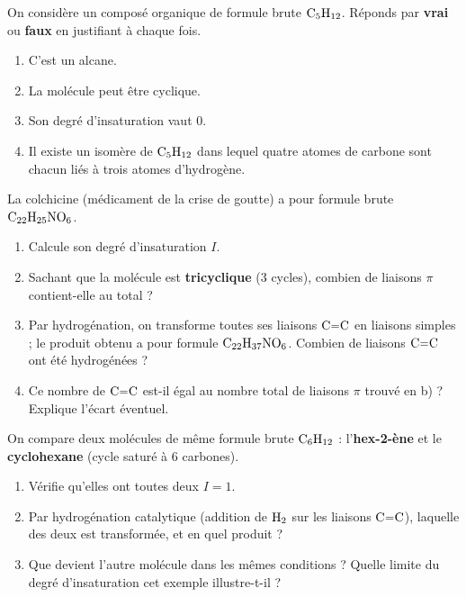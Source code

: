 \documentclass[11pt,a4paper]{article}
\begin{document}
\begin{exo}
On considère un composé organique de formule brute $\ce{C5H12}$. Réponds par \textbf{vrai} ou \textbf{faux} en justifiant à chaque fois.
\begin{enumerate}[label=\alph*)]
  \item C'est un alcane.
  \item La molécule peut être cyclique.
  \item Son degré d'insaturation vaut $0$.
  \item Il existe un isomère de $\ce{C5H12}$ dans lequel quatre atomes de carbone sont chacun liés à trois atomes d'hydrogène.
\end{enumerate}
\end{exo}

\begin{exo}
La colchicine (médicament de la crise de goutte) a pour formule brute $\ce{C22H25NO6}$.
\begin{enumerate}[label=\alph*)]
  \item Calcule son degré d'insaturation $I$.
  \item Sachant que la molécule est \textbf{tricyclique} ($3$ cycles), combien de liaisons $\pi$ contient-elle au total ?
  \item Par hydrogénation, on transforme toutes ses liaisons $\ce{C=C}$ en liaisons simples ; le produit obtenu a pour formule $\ce{C22H37NO6}$. Combien de liaisons $\ce{C=C}$ ont été hydrogénées ?
  \item Ce nombre de $\ce{C=C}$ est-il égal au nombre total de liaisons $\pi$ trouvé en b) ? Explique l'écart éventuel.
\end{enumerate}
\end{exo}

\begin{exo}
On compare deux molécules de même formule brute $\ce{C6H12}$ : l'\textbf{hex-2-ène}  et le \textbf{cyclohexane} (cycle saturé à $6$ carbones).
\begin{enumerate}[label=\alph*)]
  \item Vérifie qu'elles ont toutes deux $I=1$.
  \item Par hydrogénation catalytique (addition de $\ce{H2}$ sur les liaisons $\ce{C=C}$), laquelle des deux est transformée, et en quel produit ?
  \item Que devient l'autre molécule dans les mêmes conditions ? Quelle limite du degré d'insaturation cet exemple illustre-t-il ?
\end{enumerate}
\end{exo}
\end{document}
